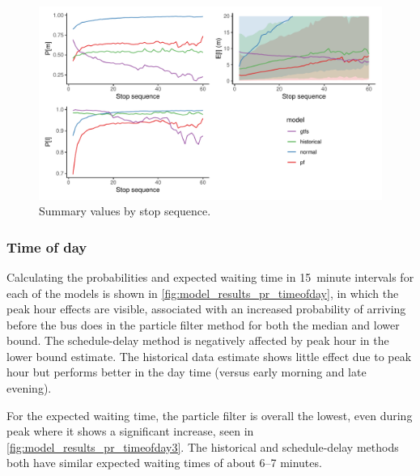 \begin{knitrout}\small
{}\color{fgcolor}\begin{figure}
\includegraphics[width=\textwidth]{figure/model_results_pr_stop-1} \caption[Summary values by stop sequence]{Summary values by stop sequence.}\label{fig:model_results_pr_stop}
\end{figure}


\end{knitrout}


\subsubsection{Time of day}

Calculating the probabilities and expected waiting time in 15~minute intervals for each of the models is shown in \cref{fig:model_results_pr_timeofday}, in which the peak hour effects are visible, associated with an increased probability of arriving before the bus does in the particle filter method for both the median and lower bound. The schedule-delay method is negatively affected by peak hour in the lower bound estimate. The historical data estimate shows little effect due to peak hour but performs better in the day time (versus early morning and late evening).


For the expected waiting time, the particle filter is overall the lowest, even during peak where it shows a significant increase, seen in \cref{fig:model_results_pr_timeofday3}. The historical and schedule-delay methods both have similar expected waiting times of about 6--7 minutes.



